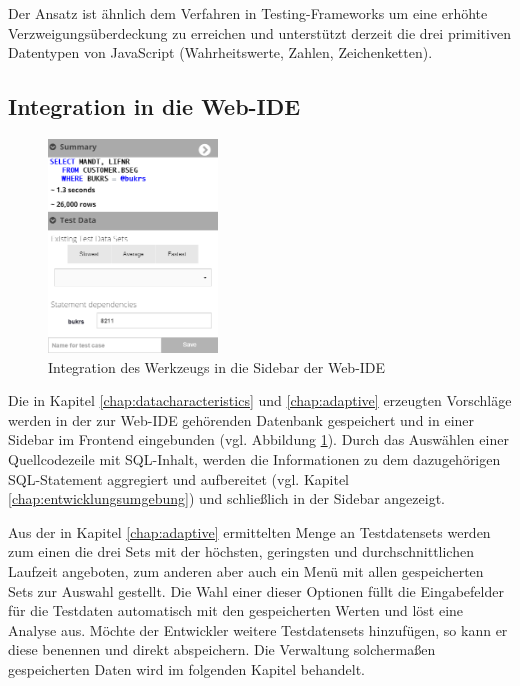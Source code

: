 Der Ansatz ist ähnlich dem Verfahren in Testing-Frameworks um eine erhöhte Verzweigungsüberdeckung zu erreichen und unterstützt derzeit die drei primitiven Datentypen von JavaScript (Wahrheitswerte, Zahlen, Zeichenketten).

\subsection{Integration in die Web-IDE}
\begin{figure}[ht]
	\centering
  \includegraphics[width=0.4\textwidth]{figures/integration.png}
	\caption{Integration des Werkzeugs in die Sidebar der Web-IDE}
	\label{fig:ideintegration}
\end{figure}

Die in Kapitel \ref{chap:datacharacteristics} und \ref{chap:adaptive} erzeugten Vorschläge werden in der zur Web-IDE gehörenden Datenbank gespeichert und in einer Sidebar im Frontend eingebunden (vgl. Abbildung \ref{fig:ideintegration}).
Durch das Auswählen einer Quellcodezeile mit SQL-Inhalt, werden die Informationen zu dem dazugehörigen SQL-Statement aggregiert und aufbereitet (vgl. Kapitel \ref{chap:entwicklungsumgebung}) und schließlich in der Sidebar angezeigt.

Aus der in Kapitel \ref{chap:adaptive} ermittelten Menge an Testdatensets werden zum einen die drei Sets mit der höchsten, geringsten und durchschnittlichen Laufzeit angeboten, zum anderen aber auch ein Menü mit allen gespeicherten Sets zur Auswahl gestellt.
Die Wahl einer dieser Optionen füllt die Eingabefelder für die Testdaten automatisch mit den gespeicherten Werten und löst eine Analyse aus.
Möchte der Entwickler weitere Testdatensets hinzufügen, so kann er diese benennen und direkt abspeichern.
Die Verwaltung solchermaßen gespeicherten Daten wird im folgenden Kapitel behandelt.
